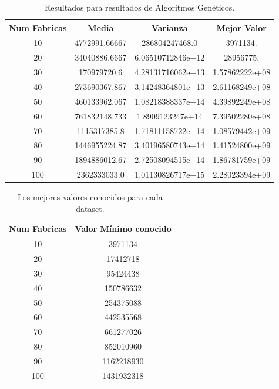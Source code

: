 \documentclass[10pt,a4paper]{article}
\begin{document}
\begin{table}
\begin{center}
\begin{tabular}{|c||c|c|c|}
\hline
Num Fabricas & Media & Varianza & Mejor Valor  \\
\hline
10 & 4772991.66667 & 286804247468.0 &  3971134.\\
\hline
20 & 34040886.6667 & 6.06510712846e+12 &  28956775.\\
\hline
30 & 170979720.6 & 4.28131716062e+13 &   1.57862222e+08\\
\hline
40 & 273690367.867 & 3.14248364801e+13 &   2.61168249e+08\\
\hline
50 & 460133962.067 & 1.08218388337e+14 &   4.39892249e+08\\
\hline
60 & 761832148.733 & 1.8909123247e+14 &   7.39502280e+08\\
\hline
70 & 1115317385.8 & 1.71811158722e+14 &   1.08579442e+09\\
\hline
80 & 1446955224.87 & 3.40196580743e+14 &   1.41524800e+09\\
\hline
90 & 1894886012.67 & 2.72508094515e+14 &   1.86781759e+09\\
\hline
100 & 2362333033.0 & 1.01130826717e+15 &   2.28023394e+09\\
\hline
\end{tabular}
\end{center}
\caption{Resultados para resultados de Algoritmos Genéticos.}
\label{tab:resultadosGA}
\end{table}

\begin{table}
\begin{center}
\begin{tabular}{|c||c|}
\hline
Num Fabricas & Valor Mínimo conocido \\
\hline \hline
10 & 3971134 \\
\hline
20 & 17412718 \\
\hline
30 & 95424438 \\
\hline
40 & 150786632 \\
\hline
50 & 254375088 \\
\hline
60 & 442535568 \\
\hline
70 & 661277026 \\
\hline
80 & 852010960 \\
\hline
90 & 1162218930 \\
\hline
100 & 1431932318 \\
\hline

\end{tabular}
\end{center}
\caption{Los mejores valores conocidos para cada dataset.}
\label{tab:bestKnownValues}
\end{table}
\end{document}
